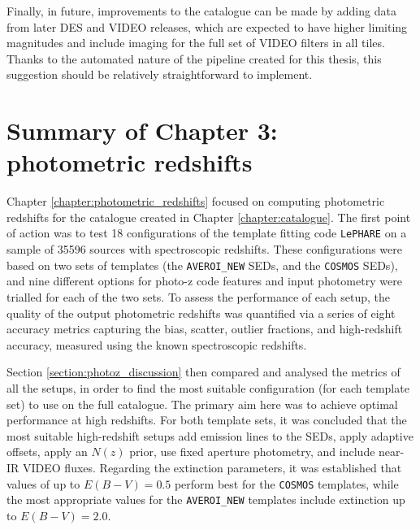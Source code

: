 Finally, in future, improvements to the catalogue can be made by adding data from later DES and VIDEO releases, which are expected to have higher limiting magnitudes and include imaging for the full set of VIDEO filters in all tiles. Thanks to the automated nature of the pipeline created for this thesis, this suggestion should be relatively straightforward to implement. \par



\section{Summary of Chapter 3: photometric redshifts}
Chapter \ref{chapter:photometric_redshifts} focused on computing photometric redshifts for the \DESVIDEO catalogue created in Chapter \ref{chapter:catalogue}. The first point of action was to test 18 configurations of the template fitting code \texttt{LePHARE} on a sample of \num{35 596} \DESVIDEO sources with spectroscopic redshifts. These configurations were based on two sets of templates (the \texttt{AVEROI\_NEW} SEDs, and the \texttt{COSMOS} SEDs), and nine different options for photo-z code features and input photometry were trialled for each of the two sets. To assess the performance of each setup, the quality of the output photometric redshifts was quantified via a series of eight accuracy metrics capturing the bias, scatter, outlier fractions, and high-redshift accuracy, measured using the known spectroscopic redshifts. \par 

Section \ref{section:photoz_discussion} then compared and analysed the metrics of all the setups, in order to find the most suitable configuration (for each template set) to use on the full \DESVIDEO catalogue. The primary aim here was to achieve optimal performance at high redshifts. For both template sets, it was concluded that the most suitable high-redshift setups add emission lines to the SEDs, apply adaptive offsets, apply an $N(z)$ prior, use fixed  aperture photometry, and include near-IR VIDEO fluxes. Regarding the extinction parameters, it was established that values of up to $E(B-V) = 0.5$ perform best for the \texttt{COSMOS} templates, while the most appropriate values for the \texttt{AVEROI\_NEW} templates include extinction up to $E(B-V)=2.0$. \par



